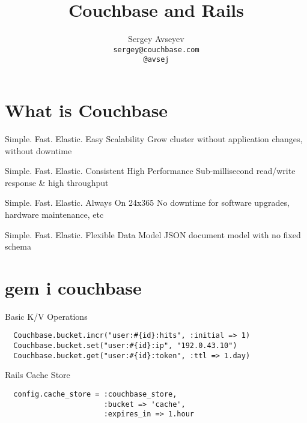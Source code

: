 \documentclass[aspectratio=43]{beamer}
\title{Couchbase and Rails}
\author{Sergey Avseyev\\\texttt{sergey@couchbase.com}\\\texttt{@avsej}}
\begin{document}
\titleback
\begin{frame}
  \titlepage
\end{frame}

\section{What is Couchbase}

\begin{frame}{Simple. Fast. Elastic.}
  \claim
    {Easy Scalability}
    {Grow cluster without application changes, without downtime}
\end{frame}

\begin{frame}{Simple. Fast. Elastic.}
  \claim
    {Consistent High Performance}
    {Sub-millisecond read/write response \& high throughput}
\end{frame}

\begin{frame}{Simple. Fast. Elastic.}
  \claim
    {Always On 24x365}
    {No downtime for software upgrades, hardware maintenance, etc}
\end{frame}

\begin{frame}{Simple. Fast. Elastic.}
  \claim
    {Flexible Data Model}
    {JSON document model with no fixed schema}
\end{frame}

\section{gem i couchbase}
\begin{frame}[fragile]{Basic K/V Operations}
  \begin{verbatim}
  Couchbase.bucket.incr("user:#{id}:hits", :initial => 1)
  Couchbase.bucket.set("user:#{id}:ip", "192.0.43.10")
  Couchbase.bucket.get("user:#{id}:token", :ttl => 1.day)
  \end{verbatim}
\end{frame}

\begin{frame}[fragile]{Rails Cache Store}
  \begin{verbatim}
  config.cache_store = :couchbase_store,
                       :bucket => 'cache',
                       :expires_in => 1.hour
  \end{verbatim}
\end{frame}
\end{document}
